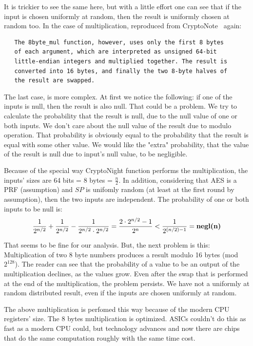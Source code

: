 It is trickier to see the same here, but with a little effort one can see that if the input is chosen uniformly at random, then the result is uniformly chosen at random too. In the case of multiplication, reproduced from CryptoNote~\cite{cryptonight} again:
\begin{verbatim}
   The 8byte_mul function, however, uses only the first 8 bytes
   of each argument, which are interpreted as unsigned 64-bit
   little-endian integers and multiplied together. The result is
   converted into 16 bytes, and finally the two 8-byte halves of
   the result are swapped.
\end{verbatim}

The last case, is more complex. At first we notice the following: if one of the inputs is null, then the result is also null. That could be a problem. We try to calculate the probability that the result is null, due to the null value of one or both inputs. We don't care about the null value of the result due to modulo operation. That probability is obviously equal to the probability that the result is equal with some other value. We would like the "extra" probability, that the value of the result is null due to input's null value, to be negligible.

Because of the special way CryptoNight function performs the multiplication, the inputs' sizes are 64 bits = 8 bytes = $\frac{n}{2}$. In addition, considering that AES is a PRF (assumption) and $SP$ is unifomly random (at least at the first round by assumption), then the two inputs are independent. The probability of one or both inputs to be null is:
\begin{equation} \label{prob_zero}
  \frac{1}{2^{n/2}} + \frac{1}{2^{n/2}} - \frac{1}{2^{n/2} \cdot 2^{n/2}} = \frac{2\cdot2^{n/2}-1}{2^n} < \frac{1}{2^{(n/2)-1}} = \mbox{\textbf{negl(n)}}
\end{equation}
\vspace{0.3cm}

That seems to be fine for our analysis. But, the next problem is this: Multiplication of two 8 byte numbers produces a result modulo 16 bytes (mod $2^{128}$). The reader can see that the probability of a value to be an output of the multiplication declines, as the values grow. Even after the swap that is performed at the end of the multiplication, the problem persists. We have not a uniformly at random distributed result, even if the inputs are chosen uniformly at random.

The above multiplication is perfomed this way because of the modern CPU registers' size. The 8 bytes multiplication is optimized. ASICs couldn't do this as fast as a modern CPU could, but technology advances and now there are chips that do the same computation roughly with the same time cost.

